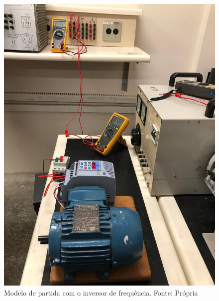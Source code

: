 \documentclass[a4paper, 12pt,oneside, english, brazil]{abntex2}
\begin{document}
\begin{figure}[H]
    \centering
    \includegraphics[scale=0.26]{partidinha.jpg}
    \caption{Modelo de partida com o inversor de frequência. Fonte: Própria}
    \label{partid}
\end{figure}
\end{document}
